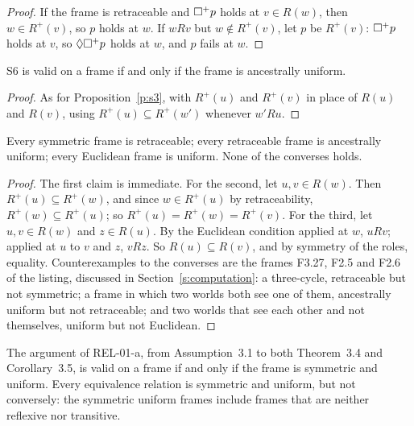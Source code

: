 \documentclass{situationist-preprint}
\newcommand{\Rp}{R^{+}}
\newcommand{\nplus}{\nec^{+}}
\begin{document}
\begin{proof}
If the frame is retraceable and $\nplus p$ holds at $v \in R(w)$, then $w \in \Rp(v)$, so $p$ holds at $w$. If $wRv$ but $w \notin \Rp(v)$, let $p$ be $\Rp(v)$: $\nplus p$ holds at $v$, so $\pos\nplus p$ holds at $w$, and $p$ fails at $w$.
\end{proof}

\begin{proposition}\label{p:s6}
S6 is valid on a frame if and only if the frame is ancestrally uniform.
\end{proposition}

\begin{proof}
As for Proposition~\ref{p:s3}, with $\Rp(u)$ and $\Rp(v)$ in place of $R(u)$ and $R(v)$, using $\Rp(u) \subseteq \Rp(w')$ whenever $w' R u$.
\end{proof}

\begin{lemma}\label{l:inclusions}
Every symmetric frame is retraceable; every retraceable frame is ancestrally uniform; every Euclidean frame is uniform. None of the converses holds.
\end{lemma}

\begin{proof}
The first claim is immediate. For the second, let $u, v \in R(w)$. Then $\Rp(u) \subseteq \Rp(w)$, and since $w \in \Rp(u)$ by retraceability, $\Rp(w) \subseteq \Rp(u)$; so $\Rp(u) = \Rp(w) = \Rp(v)$. For the third, let $u, v \in R(w)$ and $z \in R(u)$. By the Euclidean condition applied at $w$, $uRv$; applied at $u$ to $v$ and $z$, $vRz$. So $R(u) \subseteq R(v)$, and by symmetry of the roles, equality. Counterexamples to the converses are the frames F3.27, F2.5 and F2.6 of the listing, discussed in Section~\ref{s:computation}: a three-cycle, retraceable but not symmetric; a frame in which two worlds both see one of them, ancestrally uniform but not retraceable; and two worlds that see each other and not themselves, uniform but not Euclidean.
\end{proof}

\begin{corollary}\label{c:orig}
The argument of REL-01-a, from Assumption~3.1 to both Theorem~3.4 and Corollary~3.5, is valid on a frame if and only if the frame is symmetric and uniform. Every equivalence relation is symmetric and uniform, but not conversely: the symmetric uniform frames include frames that are neither reflexive nor transitive.
\end{corollary}
\end{document}
